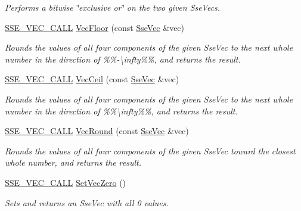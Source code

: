 \begin{DoxyCompactItemize}
\begin{DoxyCompactList}\small\item\em Performs a bitwise \char`\"{}exclusive or\char`\"{} on the two given Sse\+Vecs. \end{DoxyCompactList}\item 
\hyperlink{ssevec__math__defs_8h_a97454f977a5281455cecacce1e8ba670}{S\+S\+E\+\_\+\+V\+E\+C\+\_\+\+C\+A\+L\+L} \hyperlink{group___s_i_m_d_vec_math_gac163833435974faa24c026a9709eb7d4}{Vec\+Floor} (const \hyperlink{namespacegofxmath_a634570ddcd2496053ee966227080e02f}{Sse\+Vec} \&vec)
\begin{DoxyCompactList}\small\item\em Rounds the values of all four components of the given Sse\+Vec to the next whole number in the direction of \%\%-\/\textbackslash{}infty\%\%, and returns the result. \end{DoxyCompactList}\item 
\hyperlink{ssevec__math__defs_8h_a97454f977a5281455cecacce1e8ba670}{S\+S\+E\+\_\+\+V\+E\+C\+\_\+\+C\+A\+L\+L} \hyperlink{group___s_i_m_d_vec_math_ga8a1aa92fcef0713d09a19c8d3df476b8}{Vec\+Ceil} (const \hyperlink{namespacegofxmath_a634570ddcd2496053ee966227080e02f}{Sse\+Vec} \&vec)
\begin{DoxyCompactList}\small\item\em Rounds the values of all four components of the given Sse\+Vec to the next whole number in the direction of \%\%\textbackslash{}infty\%\%, and returns the result. \end{DoxyCompactList}\item 
\hyperlink{ssevec__math__defs_8h_a97454f977a5281455cecacce1e8ba670}{S\+S\+E\+\_\+\+V\+E\+C\+\_\+\+C\+A\+L\+L} \hyperlink{group___s_i_m_d_vec_math_ga458ffba4de61723c646a36595a67d63c}{Vec\+Round} (const \hyperlink{namespacegofxmath_a634570ddcd2496053ee966227080e02f}{Sse\+Vec} \&vec)
\begin{DoxyCompactList}\small\item\em Rounds the values of all four components of the given Sse\+Vec toward the closest whole number, and returns the result. \end{DoxyCompactList}\item 
\hyperlink{ssevec__math__defs_8h_a97454f977a5281455cecacce1e8ba670}{S\+S\+E\+\_\+\+V\+E\+C\+\_\+\+C\+A\+L\+L} \hyperlink{group___s_i_m_d_vec_math_ga85f7501f91a11ba01f589001a5e7b147}{Set\+Vec\+Zero} ()
\begin{DoxyCompactList}\small\item\em Sets and returns an Sse\+Vec with all 0 values. \end{DoxyCompactList}\item 

\end{DoxyCompactItemize}
